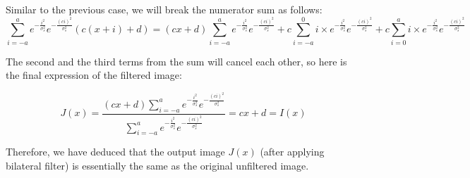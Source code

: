 \documentclass[12pt]{article}
\begin{document}
Similar to the previous case, we will break the numerator sum as follows:
\[\sum_{i=-a}^a e^{-\frac{i^2}{\sigma_s^2}} e^{-\frac{(ci)^2}{\sigma_s^2}}(c(x+i)+d) = (cx+d)\sum_{i=-a}^a e^{-\frac{i^2}{\sigma_s^2}} e^{-\frac{(ci)^2}{\sigma_s^2}} + c\sum_{i=-a}^{0}i\times e^{-\frac{i^2}{\sigma_s^2}} e^{-\frac{(ci)^2}{\sigma_s^2}} + c\sum_{i=0}^{a}i\times e^{-\frac{i^2}{\sigma_s^2}} e^{-\frac{(ci)^2}{\sigma_s^2}}\]

The second and the third terms from the sum will cancel each other, so here is the final expression of the filtered image:

\[J(x) = \frac{(cx+d)\sum_{i=-a}^a e^{-\frac{i^2}{\sigma_s^2}} e^{-\frac{(ci)^2}{\sigma_s^2}}}{\sum_{i=-a}^a e^{-\frac{i^2}{\sigma_s^2}} e^{-\frac{(ci)^2}{\sigma_s^2}}} = cx+d = I(x)\]


Therefore, we have deduced that the output image $J(x)$ (after applying bilateral filter) is essentially the same as the original unfiltered image.
\end{document}
